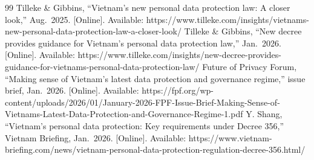 \begin{thebibliography}{99}
 Tilleke \& Gibbins, ``Vietnam's new personal data protection law: A closer look,'' Aug.~2025. {[}Online{]}. Available: https://www.tilleke.com/insights/vietnams-new-personal-data-protection-law-a-closer-look/
 Tilleke \& Gibbins, ``New decree provides guidance for Vietnam's personal data protection law,'' Jan.~2026. {[}Online{]}. Available: https://www.tilleke.com/insights/new-decree-provides-guidance-for-vietnams-personal-data-protection-law/
 Future of Privacy Forum, ``Making sense of Vietnam's latest data protection and governance regime,'' issue brief, Jan.~2026. {[}Online{]}. Available: https://fpf.org/wp-content/uploads/2026/01/January-2026-FPF-Issue-Brief-Making-Sense-of-Vietnams-Latest-Data-Protection-and-Governance-Regime-1.pdf
 Y. Shang, ``Vietnam's personal data protection: Key requirements under Decree 356,'' Vietnam Briefing, Jan.~2026. {[}Online{]}. Available: https://www.vietnam-briefing.com/news/vietnam-personal-data-protection-regulation-decree-356.html/
\end{thebibliography}
